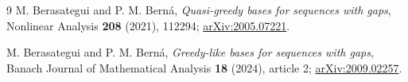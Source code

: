 \documentclass[11pt]{article}
\begin{document}
\begin{thebibliography}{9}
M. Berasategui and P. M. Bern\'a,
\emph{Quasi-greedy bases for sequences with gaps},
Nonlinear Analysis \textbf{208} (2021), 112294;
\href{https://arxiv.org/abs/2005.07221}{arXiv:2005.07221}.

M. Berasategui and P. M. Bern\'a,
\emph{Greedy-like bases for sequences with gaps},
Banach Journal of Mathematical Analysis \textbf{18} (2024), article 2;
\href{https://arxiv.org/abs/2009.02257}{arXiv:2009.02257}.
\end{thebibliography}
\end{document}
